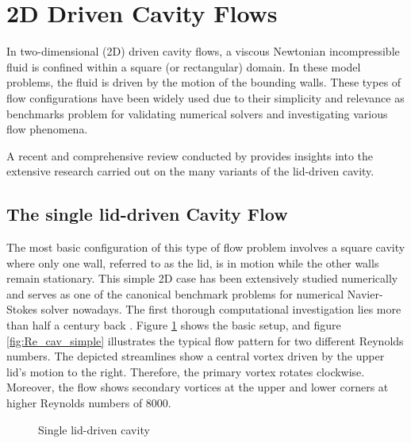 
\section{2D Driven Cavity Flows} \label{sec:driven_cav}

In two-dimensional (2D) driven cavity flows, a viscous Newtonian incompressible
fluid is confined within a square (or rectangular) domain. In these model
problems, the fluid is driven by the motion of the bounding walls. These
types of flow configurations have been widely used due to their simplicity and
relevance as benchmarks problem for validating numerical solvers and
investigating various flow phenomena.

A recent and comprehensive review conducted by \citet{kuhlmann2019} provides
insights into the extensive research carried out on the many variants of the
lid-driven cavity.

\subsection{The single lid-driven Cavity Flow}

The most basic configuration of this type of flow problem involves a square
cavity where only one wall, referred to as the lid, is in motion while the
other walls remain stationary. This simple 2D case has been extensively studied
numerically and serves as one of the canonical benchmark problems for numerical
Navier-Stokes solver nowadays. The first thorough computational
investigation lies more than half a century back \citep{burggraf1966}. Figure
\ref{fig:cav_simple} shows the basic setup, and figure \ref{fig:Re_cav_simple}
illustrates the typical flow pattern for two different Reynolds numbers. The
depicted streamlines show a central vortex driven by the upper lid's motion to
the right. Therefore, the primary vortex rotates clockwise. Moreover, the flow
shows secondary vortices at the upper and lower corners at higher Reynolds
numbers of $8000$.

\begin{figure}[ht]
\centering
{}
\caption{Single lid-driven cavity}
\label{fig:cav_simple}
\end{figure}

